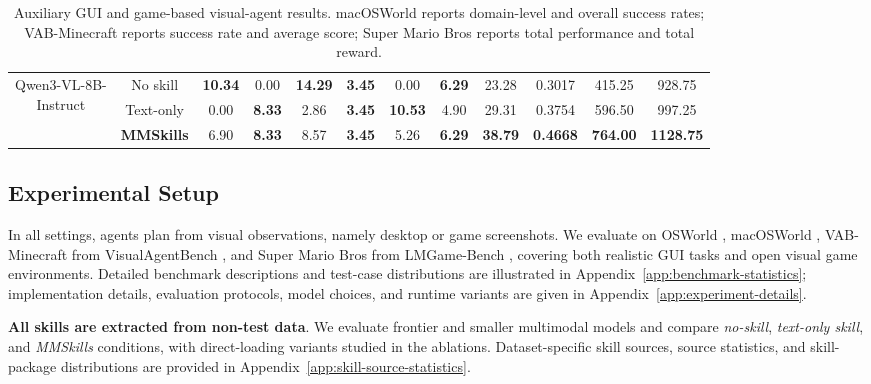 \documentclass{llmxive}
\providecommand{\mmskillhl}{\cellcolor{mmskillrow}}
\begin{document}
\begin{table}[!t]
{\begin{tabular}{cccccccccccc}
\midrule
\multirow{3}{*}{\parbox{1.9cm}{\centering Qwen3-VL-8B-\\Instruct}}
 & No skill & \textbf{10.34} & 0.00 & \textbf{14.29} & \textbf{3.45} & 0.00 & \textbf{6.29} & 23.28 & 0.3017 & 415.25 & 928.75 \\
 & Text-only & 0.00 & \textbf{8.33} & 2.86 & \textbf{3.45} & \textbf{10.53} & 4.90 & 29.31 & 0.3754 & 596.50 & 997.25 \\
 & \mmskillhl \textbf{MMSkills} & \mmskillhl 6.90 & \mmskillhl \textbf{8.33} & \mmskillhl 8.57 & \mmskillhl \textbf{3.45} & \mmskillhl 5.26 & \mmskillhl \textbf{6.29} & \mmskillhl \textbf{38.79} & \mmskillhl \textbf{0.4668} & \mmskillhl \textbf{764.00} & \mmskillhl \textbf{1128.75} \\
\bottomrule
\end{tabular}}
\caption{Auxiliary GUI and game-based visual-agent results. macOSWorld reports domain-level and overall success rates; VAB-Minecraft reports success rate and average score; Super Mario Bros reports total performance and total reward.}
\label{tab:auxiliary-results}
\end{table}

\renewcommand{\mmskillhl}{\cellcolor{mmskillrow}}



\subsection{Experimental Setup}
\label{sec:experiments-setup}

In all settings, agents plan from visual observations, namely desktop or game screenshots. We evaluate on OSWorld \citep{xie2024osworld}, macOSWorld \citep{yang2025macosworld}, VAB-Minecraft from VisualAgentBench \citep{liu2024visualagentbench}, and Super Mario Bros from LMGame-Bench \citep{hu2025lmgamebenchgoodllmsplaying}, covering both realistic GUI tasks and open visual game environments. Detailed benchmark descriptions and test-case distributions are illustrated in Appendix~\ref{app:benchmark-statistics}; implementation details, evaluation protocols, model choices, and runtime variants are given in Appendix~\ref{app:experiment-details}.

\textbf{All skills are extracted from non-test data}. We evaluate frontier and smaller multimodal models and compare \emph{no-skill}, \emph{text-only skill}, and \emph{MMSkills} conditions, with direct-loading variants studied in the ablations. Dataset-specific skill sources, source statistics, and skill-package distributions are provided in Appendix~\ref{app:skill-source-statistics}.
\end{document}
